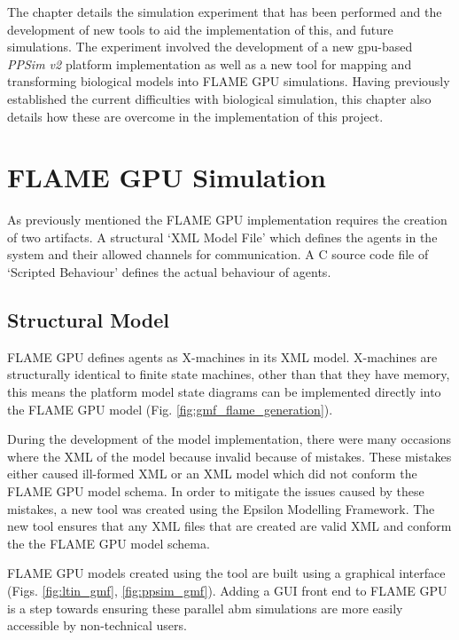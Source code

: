 \documentclass{UoYCSproject}
\begin{document}
The chapter details the simulation experiment that has been performed and the development of new tools to aid the implementation of this, and future simulations.
The experiment involved the development of a new \acrshort{gpu}-based \textit{PPSim v2} platform implementation as well as a new tool for mapping and transforming biological models into \gls{FLAME GPU} simulations.
Having previously established the current difficulties with biological simulation, this chapter also details how these are overcome in the implementation of this project.

\section{\gls{FLAME GPU} Simulation}
As previously mentioned the \gls{FLAME GPU} implementation requires the creation of two artifacts.
A structural `XML Model File' which defines the agents in the system and their allowed channels for communication.
A C source code file of `Scripted Behaviour' defines the actual behaviour of agents.

\subsection{Structural Model}
\gls{FLAME GPU} defines agents as X-machines in its XML model.
X-machines are structurally identical to finite state machines, other than that they have memory, this means the platform model state diagrams can be implemented directly into the \gls{FLAME GPU} model (Fig. \ref{fig:gmf_flame_generation}).

During the development of the model implementation, there were many occasions where the XML of the model because invalid because of mistakes.
These mistakes either caused ill-formed XML or an XML model which did not conform the \gls{FLAME GPU} model schema.
In order to mitigate the issues caused by these mistakes, a new tool was created using the Epsilon Modelling Framework.
The new tool ensures that any XML files that are created are valid XML and conform the the \gls{FLAME GPU} model schema.

\gls{FLAME GPU} models created using the tool are built using a graphical interface (Figs. \ref{fig:ltin_gmf}, \ref{fig:ppsim_gmf}).
Adding a GUI front end to \gls{FLAME GPU} is a step towards ensuring these parallel \gls{abm} simulations are more easily accessible by non-technical users.
\end{document}
